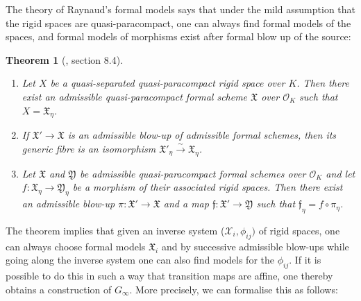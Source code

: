 \documentclass[10pt,oneside]{amsart}
\newtheorem{theorem}{Theorem}[section]
\theoremstyle{definition}
\theoremstyle{remark}
\begin{document}
	The theory of Raynaud's formal models says that under the mild assumption that the rigid spaces are quasi-paracompact,
	one can always find formal models of the spaces, and formal models of morphisms exist after formal blow up of the source:
	
	\begin{theorem}[\cite{Bosch lectures}, section 8.4]\label{Raynaud theory main theorem}
		\leavevmode
		\begin{enumerate}
			
			\item Let $X$ be a quasi-separated quasi-paracompact rigid space over $K$. Then there exist an admissible quasi-paracompact formal scheme $\mathfrak X$ over $\mathcal O_K$ such that $X=\mathfrak X_\eta$.
			\item If $\mathfrak X'\rightarrow \mathfrak X$ is an admissible blow-up of admissible formal schemes, then its generic fibre is an isomorphism $\mathfrak X'_\eta \xrightarrow{\sim} \mathfrak X_\eta$.
			\item Let $\mathfrak X$ and $\mathfrak Y$ be admissible quasi-paracompact formal schemes over $\mathcal O_K$ and let $f:\mathfrak X_\eta \rightarrow \mathfrak Y_\eta$ be a morphism of their associated rigid spaces. Then there exist an admissible blow-up $\pi:\mathfrak X'\rightarrow \mathfrak X$ and a map $\mathfrak f:\mathfrak X'\rightarrow \mathfrak Y$ such that $\mathfrak f_\eta = f\circ \pi_\eta$.
			\begin{center}
				
			\end{center}
		\end{enumerate}
	\end{theorem}
	
	The theorem implies that given an inverse system ($\mathcal X_i,\phi_{ij})$ of rigid spaces, one can always choose formal models $\mathfrak X_i$ and by successive admissible blow-ups while going along the inverse system one can also find models for the $\phi_{ij}$. 
	If it is possible to do this in such a way that transition maps are affine, one thereby obtains a construction of $G_\infty$. More precisely, we can formalise this as follows:
	
\end{document}
